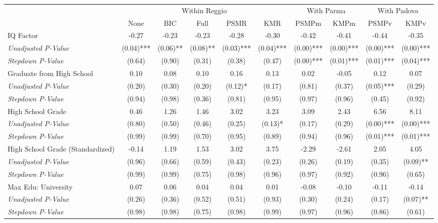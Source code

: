 \begin{tabular}{l c c c c c c c c c}
\toprule
& \multicolumn{5}{c}{Within Reggio} & \multicolumn{2}{c}{With Parma} & \multicolumn{2}{c}{With Padova} \\\cmidrule(lr){2-6} \cmidrule(lr){7-8} \cmidrule(lr){9-10}
 & None & BIC & Full & PSMR & KMR & PSMPm & KMPm & PSMPv & KMPv \\
\midrule
IQ Factor & -0.27 & -0.23 & -0.23 & -0.28 & -0.30 & -0.42 & -0.41 & -0.44 & -0.35 \\
\quad \textit{Unadjusted P-Value} & (0.04)*** & (0.06)** & (0.08)** & (0.03)*** & (0.04)*** & (0.00)*** & (0.00)*** & (0.00)*** & (0.00)*** \\
\quad \textit{Stepdown P-Value} & (0.64) & (0.90) & (0.31) & (0.38) & (0.47) & (0.00)*** & (0.01)*** & (0.01)*** & (0.04)*** \\
Graduate from High School & 0.10 & 0.08 & 0.10 & 0.16 & 0.13 & 0.02 & -0.05 & 0.12 & 0.07 \\
\quad \textit{Unadjusted P-Value} & (0.20) & (0.30) & (0.20) & (0.12)* & (0.17) & (0.81) & (0.37) & (0.05)*** & (0.29) \\
\quad \textit{Stepdown P-Value} & (0.94) & (0.98) & (0.36) & (0.81) & (0.95) & (0.97) & (0.96) & (0.45) & (0.92) \\
High School Grade & 0.46 & 1.26 & 1.46 & 3.02 & 3.23 & 3.09 & 2.43 & 6.56 & 8.11 \\
\quad \textit{Unadjusted P-Value} & (0.80) & (0.50) & (0.46) & (0.25) & (0.13)* & (0.17) & (0.29) & (0.00)*** & (0.00)*** \\
\quad \textit{Stepdown P-Value} & (0.99) & (0.99) & (0.70) & (0.95) & (0.89) & (0.94) & (0.96) & (0.01)*** & (0.01)*** \\
High School Grade (Standardized) & -0.14 & 1.19 & 1.53 & 3.02 & 3.75 & -2.29 & -2.61 & 2.05 & 4.05 \\
\quad \textit{Unadjusted P-Value} & (0.96) & (0.66) & (0.59) & (0.43) & (0.23) & (0.26) & (0.19) & (0.35) & (0.09)** \\
\quad \textit{Stepdown P-Value} & (0.99) & (0.99) & (0.75) & (0.98) & (0.96) & (0.97) & (0.92) & (0.96) & (0.65) \\
Max Edu: University & 0.07 & 0.06 & 0.04 & 0.04 & 0.01 & -0.08 & -0.10 & -0.11 & -0.14 \\
\quad \textit{Unadjusted P-Value} & (0.26) & (0.36) & (0.52) & (0.51) & (0.93) & (0.30) & (0.24) & (0.17) & (0.07)** \\
\quad \textit{Stepdown P-Value} & (0.98) & (0.98) & (0.75) & (0.98) & (0.99) & (0.97) & (0.96) & (0.86) & (0.61) \\

\end{tabular}
